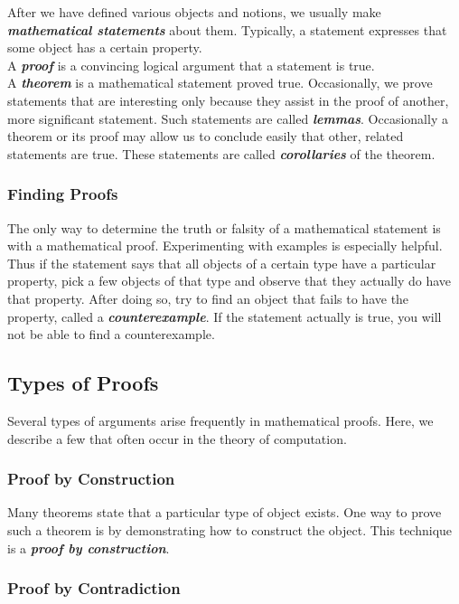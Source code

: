 \documentclass{article}
\theoremstyle{definition}
\newcommand{\define}[1]{\textbf{\textit{#1}}}
\begin{document}
After we have defined various objects and notions, we usually make \define{mathematical statements} about them. Typically, a statement expresses that some object has a certain property. \\

A \define{proof} is a convincing logical argument that a statement is true. \\ 

A \define{theorem} is a mathematical statement proved true. Occasionally, we prove statements that are interesting only because they assist in the proof of another, more significant statement. Such statements are called \define{lemmas}. Occasionally a theorem or its proof may allow us to conclude easily that other, related statements are true. These statements are called \define{corollaries} of the theorem. 

\subsubsection{Finding Proofs}

The only way to determine the truth or falsity of a mathematical statement is with a mathematical proof. Experimenting with examples is especially helpful. Thus if the statement says that all objects of a certain type have a particular property, pick a few objects of that type and observe that they actually do have that property. After doing so, try to find an object that fails to have the property, called a \define{counterexample}. If the statement actually is true, you will not be able to find a counterexample. 

\subsection{Types of Proofs}
Several types of arguments arise frequently in mathematical proofs. Here, we describe a few that often occur in the theory of computation. 

\subsubsection{Proof by Construction}

Many theorems state that a particular type of object exists. One way to prove such a theorem is by demonstrating how to construct the object. This technique is a \define{proof by construction}. 

\subsubsection{Proof by Contradiction}
\end{document}
